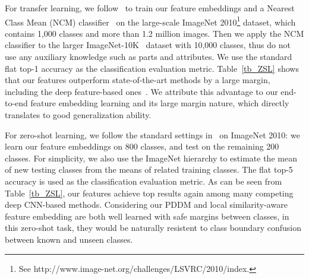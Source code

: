 \documentclass{article}
\begin{document}
For transfer learning, we follow~\cite{Mensink2013} to train our feature embeddings and a Nearest Class Mean (NCM) classifier~\cite{Mensink2013} on the large-scale ImageNet 2010\footnote{See http://www.image-net.org/challenges/LSVRC/2010/index.} dataset, which contains 1,000 classes and more than 1.2 million images. Then we apply the NCM classifier to the larger ImageNet-10K~\cite{Deng2010} dataset with 10,000 classes, thus do not use any auxiliary knowledge such as parts and attributes. We use the standard flat top-1 accuracy as the classification evaluation metric. Table~\ref{tb_ZSL} shows that our features outperform state-of-the-art methods by a large margin, including the deep feature-based ones~\cite{Quoc2012,Mensink2013}. We attribute this advantage to our end-to-end feature embedding learning and its large margin nature, which directly translates to good generalization ability.

\begin{table}[t]
  \caption{The flat top-1 accuracy (\%) of transfer learning on ImageNet-10K~\cite{Deng2010} and flat top-5 accuracy (\%) of zero-shot learning on ImageNet 2010.}
  \label{tb_ZSL}
  \centering
\vspace{-1em}
\end{table}

For zero-shot learning, we follow the standard settings in~\cite{Rohrbach2011,Mensink2013} on ImageNet 2010: we learn our feature embeddings on 800 classes, and test on the remaining 200 classes. For simplicity, we also use the ImageNet hierarchy to estimate the mean of new testing classes from the means of related training classes. The flat top-5 accuracy is used as the classification evaluation metric. As can be seen from Table~\ref{tb_ZSL}, our features achieve top results again among many competing deep CNN-based methods. Considering our PDDM and local similarity-aware feature embedding are both well learned with safe margins between classes, in this zero-shot task, they would be naturally resistent to class boundary confusion between known and unseen classes.
\end{document}
